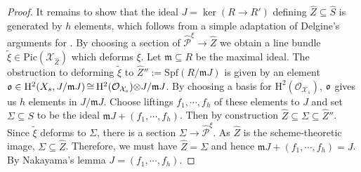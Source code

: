 \documentclass[letter, 11pt]{article}
\theoremstyle{plain}
\theoremstyle{definition}
\newcommand\iso{\,{\cong}\,}
\newcommand\tensor{{\otimes}}
\newcommand{\<}{\langle}
\renewcommand{\>}{\rangle}
\def\wt{\widetilde}
\newcommand{\frakm}{\mathfrak{m}}
\newcommand{\sX}{\mathcal{X}}
\newcommand{\sO}{\mathcal{O}}
\newcommand{\Pic}{\mathrm{Pic}}
\renewcommand{\H}{\mathrm{H}}
\newcommand{\Spf}{\mathrm{Spf}}
\newcommand{\shP}{\mathscr{P}}
\begin{document}
\begin{proof}
     It remains to show that the ideal $J = \ker(R \to R')$ defining $\hat{Z} \subseteq \hat{S}$ is generated by $h$ elements, which follows from a simple adaptation of Delgine's arguments for \cite[Prop.~1.5]{Del02}. By choosing a section of $\hat{\shP}^\xi \to \hat{Z}$ we obtain a line bundle $\wt{\xi} \in \Pic(\sX_{\hat{Z}})$ which deforms $\xi$. Let $\frakm \subseteq R$ be the maximal ideal. The obstruction to deforming $\wt{\xi}$ to $\hat{Z}'' := \Spf(R / \frakm J)$ is given by an element $\frak{o} \in \H^2(X_s, J / \frakm J) \iso \H^2(\sO_{\sX_s}) \tensor J / \frakm J$. By choosing a basis for $\H^2(\sO_{\sX_s})$, $\frak{o}$ gives us $h$ elements in $J / \frakm J$. Choose liftings $f_1, \cdots, f_h$ of these elements to $J$ and set $\Sigma \subseteq S$ to be the ideal $\frakm J + (f_1, \cdots, f_h)$. Then by construction $\hat{Z} \subseteq \Sigma \subseteq \hat{Z}''$. Since $\wt{\xi}$ deforms to $\Sigma$, there is a section $\Sigma \to \hat{\shP}^\xi$. As $\hat{Z}$ is the scheme-theoretic image, $\Sigma \subseteq \hat{Z}$. Therefore, we must have $\hat{Z} = \Sigma$ and hence $\frakm J + (f_1, \cdots, f_h) = J$. By Nakayama's lemma $J = (f_1, \cdots, f_h)$. 
\end{proof}
\end{document}
